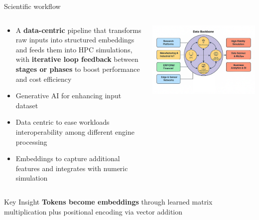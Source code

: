 \documentclass[aspectratio=169]{beamer}
\begin{document}
\begin{frame}{Scientific workflow}
    \begin{columns}
        \begin{column}{0.6\textwidth}
            \begin{itemize}
                \item A \textbf{data-centric} pipeline that transforms raw inputs into structured embeddings and feeds them into HPC simulations, with \textbf{iterative loop feedback} between \textbf{stages or phases} to boost performance and cost efficiency
                \item Generative AI for enhancing input dataset
                \item Data centric to ease workloads interoperability among different engine processing
                \item Embeddings to capture additional features and integrates with numeric simulation
            \end{itemize}
        \end{column}
        \begin{column}{0.4\textwidth}
            \includegraphics[width=\textwidth,height=0.6\textheight,keepaspectratio]{../../images/DataCentric-DataBackbone-Strategy.png}
        \end{column}
    \end{columns}
    
    \vspace{0.3cm}
    \begin{block}{Key Insight}
        \textbf {Tokens become embeddings} through learned matrix multiplication plus positional encoding via vector addition
    \end{block}
\end{frame}
\end{document}
